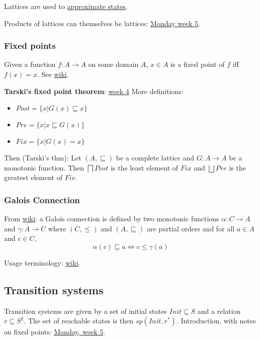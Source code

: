 \documentclass[a4paper,10pt]{article}
\newcommand{\sqleq}{\ensuremath{\sqsubseteq}}
\begin{document}
Lattices are used to
\href{http://lara.epfl.ch/w/sav09:partial_orders_for_approximation}
{approximate states}.

Products of lattices can themselves be lattices:
\href{http://lara.epfl.ch/w/sav09:products_of_lattices}
{Monday week 5}. 

\subsubsection{Fixed points} 
Given a function $f:A \rightarrow A$ on some domain $A$, $x∈A$ is a fixed point
of $f$ iff $f(x) = x$. See \href{http://lara.epfl.ch/w/sav08:fixpoints}{wiki}.

\textbf{Tarski's fixed point theorem}:
\href{http://lara.epfl.ch/w/sav08:tarski_s_fixpoint_theorem}{week 4}
 
More definitions:
\begin{itemize}
 \itemsep 0pt
 \item $Post = \{x|G(x) \sqleq x\}$
 \item $Pre = \{ x | x \sqleq G(x) \}$
 \item $Fix = \{x|G(x) = x\}$
\end{itemize}
Then (Tarski's thm): Let $(A, \sqleq)$ be a complete lattice and $G:A
\rightarrow A$ be a monotonic function. Then $\bigsqcap Post$ is the least
element of $Fix$ and $\bigsqcup Pre$ is the greatest element of $Fiv$.

\subsubsection{Galois Connection}
From \href{http://lara.epfl.ch/w/sav09:galois_connection}{wiki}: a Galois
connection is defined by two monotonic functions $\alpha:C → A$ and $\gamma:A→C$
where $(C,≤)$ and $(A,\sqleq)$ are partial orders and for all $a∈A$ and $c∈C$,
\[ \alpha(c) \sqleq a \Leftrightarrow c ≤ \gamma(a) \]

Usage terminology:
\href{http://lara.epfl.ch/w/sav12:using_galois_connection_in_abstraction_interpretation}
{wiki}.

\subsection{Transition systems} 
Transition systems are given by a set of initial states $Init \subseteq S$ and
a relation $r \subseteq S^2$. The set of reachable states is then
$sp(Init,r^*)$. Introduction, with notes on fixed points:
\href{http://lara.epfl.ch/w/sav12:abstract_interpretation_of_transition_system}
{Monday, week 5}.
\end{document}
